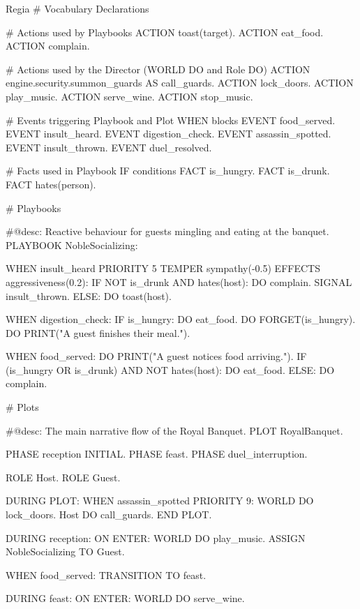 \begin{codeblock}[]{Regia}
# Vocabulary Declarations
 
# Actions used by Playbooks
ACTION toast(target).
ACTION eat_food.
ACTION complain.
 
# Actions used by the Director (WORLD DO and Role DO)
ACTION engine.security.summon_guards AS call_guards.
ACTION lock_doors.
ACTION play_music.
ACTION serve_wine.
ACTION stop_music.
 
# Events triggering Playbook and Plot WHEN blocks
EVENT food_served.
EVENT insult_heard.
EVENT digestion_check.
EVENT assassin_spotted.
EVENT insult_thrown.
EVENT duel_resolved.
 
# Facts used in Playbook IF conditions
FACT is_hungry.
FACT is_drunk.
FACT hates(person).
 
# Playbooks
 
#@desc: Reactive behaviour for guests mingling and eating at the banquet.
PLAYBOOK NobleSocializing:
 
    WHEN insult_heard PRIORITY 5 TEMPER sympathy(-0.5) EFFECTS aggressiveness(0.2):
        IF NOT is_drunk AND hates(host):
            DO complain.
            SIGNAL insult_thrown.
        ELSE:
            DO toast(host).
 
    WHEN digestion_check:
        IF is_hungry:
            DO eat_food.
            DO FORGET(is_hungry).
            DO PRINT("A guest finishes their meal.").
 
    WHEN food_served:
        DO PRINT("A guest notices food arriving.").
        IF (is_hungry OR is_drunk) AND NOT hates(host):
            DO eat_food.
        ELSE:
            DO complain.
 
# Plots
 
#@desc: The main narrative flow of the Royal Banquet.
PLOT RoyalBanquet.
 
    PHASE reception INITIAL.
    PHASE feast.
    PHASE duel_interruption.
 
    ROLE Host.
    ROLE Guest.
 
    DURING PLOT:
        WHEN assassin_spotted PRIORITY 9:
            WORLD DO lock_doors.
            Host DO call_guards.
            END PLOT.
 
    DURING reception:
        ON ENTER:
            WORLD DO play_music.
            ASSIGN NobleSocializing TO Guest.
            
        WHEN food_served:
            TRANSITION TO feast.
 
    DURING feast:
        ON ENTER:
            WORLD DO serve_wine.
            

\end{codeblock}
